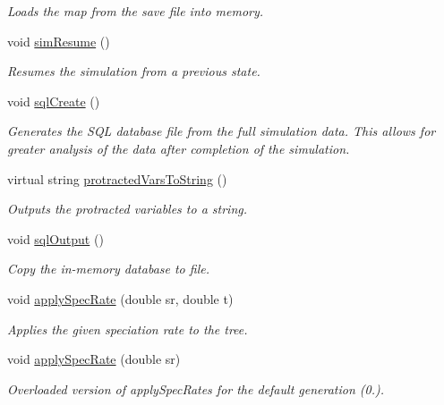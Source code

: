 \begin{DoxyCompactItemize}
\begin{DoxyCompactList}\small\item\em Loads the map from the save file into memory. \end{DoxyCompactList}\item 
void \hyperlink{class_tree_a3d614f3848dc7acab168642efe345569}{sim\+Resume} ()
\begin{DoxyCompactList}\small\item\em Resumes the simulation from a previous state. \end{DoxyCompactList}\item 
void \hyperlink{class_tree_ae784a6ed362f6c5263ee797759f715b6}{sql\+Create} ()\hypertarget{class_tree_ae784a6ed362f6c5263ee797759f715b6}{}\label{class_tree_ae784a6ed362f6c5263ee797759f715b6}

\begin{DoxyCompactList}\small\item\em Generates the S\+QL database file from the full simulation data. This allows for greater analysis of the data after completion of the simulation. \end{DoxyCompactList}\item 
virtual string \hyperlink{class_tree_aa8bb5d93c7992404ede0a49bb69ccd1f}{protracted\+Vars\+To\+String} ()
\begin{DoxyCompactList}\small\item\em Outputs the protracted variables to a string. \end{DoxyCompactList}\item 
void \hyperlink{class_tree_a8cd3db7add1884ea53b0d98002d39cd3}{sql\+Output} ()
\begin{DoxyCompactList}\small\item\em Copy the in-\/memory database to file. \end{DoxyCompactList}\item 
void \hyperlink{class_tree_ae0b48a12fd70982cc9dc2e31d7f4e84f}{apply\+Spec\+Rate} (double sr, double t)
\begin{DoxyCompactList}\small\item\em Applies the given speciation rate to the tree. \end{DoxyCompactList}\item 
void \hyperlink{class_tree_a789a2fc3bc53a99d120638fe009759ff}{apply\+Spec\+Rate} (double sr)
\begin{DoxyCompactList}\small\item\em Overloaded version of apply\+Spec\+Rates for the default generation (0.). \end{DoxyCompactList}\item 

\end{DoxyCompactItemize}
